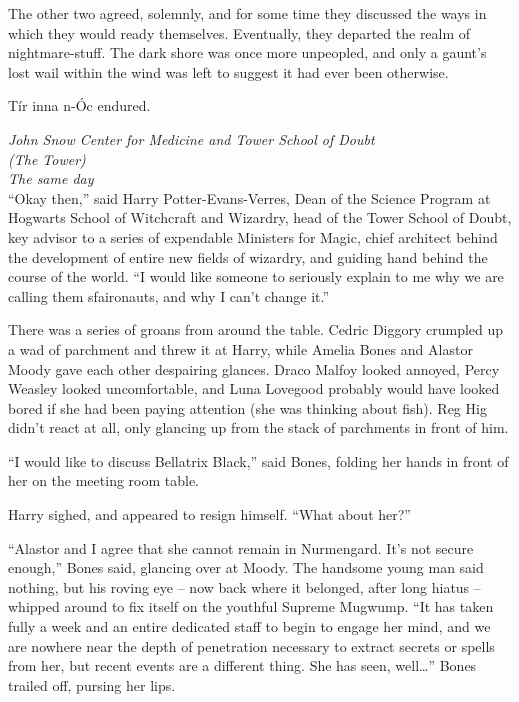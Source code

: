 The other two agreed, solemnly, and for some time they discussed the
ways in which they would ready themselves. Eventually, they departed the
realm of nightmare-stuff. The dark shore was once more unpeopled, and
only a gaunt's lost wail within the wind was left to suggest it had ever
been otherwise.

Tír inna n-Óc endured.

\mybreak

\emph{John Snow Center for Medicine and Tower School of Doubt\\
(The Tower)}\\
\emph{The same day}\\

``Okay then,'' said Harry Potter-Evans-Verres, Dean of the Science
Program at Hogwarts School of Witchcraft and Wizardry, head of the Tower
School of Doubt, key advisor to a series of expendable Ministers for
Magic, chief architect behind the development of entire new fields of
wizardry, and guiding hand behind the course of the world. ``I would
like someone to seriously explain to me why we are calling them
sfaironauts, and why I can't change it.''

There was a series of groans from around the table. Cedric Diggory
crumpled up a wad of parchment and threw it at Harry, while Amelia Bones
and Alastor Moody gave each other despairing glances. Draco Malfoy
looked annoyed, Percy Weasley looked uncomfortable, and Luna Lovegood
probably would have looked bored if she had been paying attention (she
was thinking about fish). Reg Hig didn't react at all, only glancing up
from the stack of parchments in front of him.

``I would like to discuss Bellatrix Black,'' said Bones, folding her
hands in front of her on the meeting room table.

Harry sighed, and appeared to resign himself. ``What about her?''

``Alastor and I agree that she cannot remain in Nurmengard. It's not
secure enough,'' Bones said, glancing over at Moody. The handsome young
man said nothing, but his roving eye -- now back where it belonged,
after long hiatus -- whipped around to fix itself on the youthful
Supreme Mugwump. ``It has taken fully a week and an entire dedicated
staff to begin to engage her mind, and we are nowhere near the depth of
penetration necessary to extract secrets or spells from her, but recent
events are a different thing. She has seen, well\ldots{}'' Bones trailed
off, pursing her lips.

